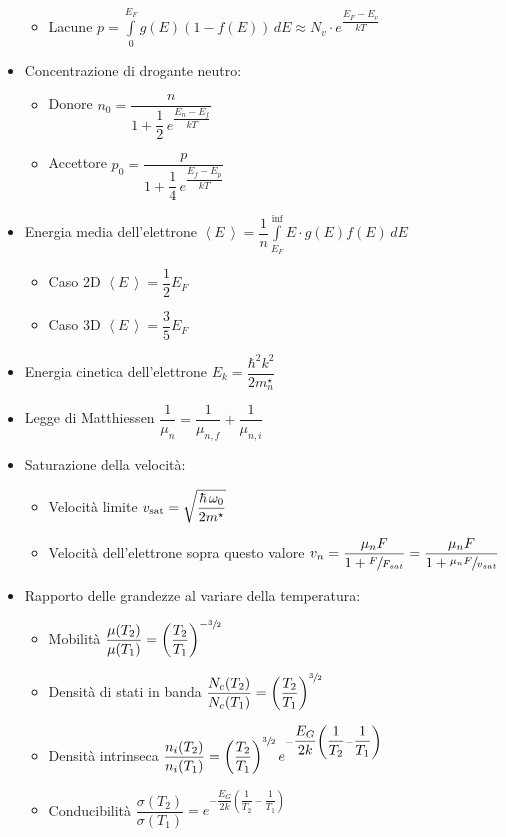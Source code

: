 \documentclass[9pt]{extarticle}
\begin{document}
\begin{itemize}
\begin{itemize}
          \item Lacune \( \displaystyle p = \int\limits_{0}^{E_F} g(E) \left( 1- f(E) \right) \, dE \approx N_v \cdot e ^  {\dfrac{E_F - E_v}{kT}} \)
        \end{itemize}
  \item Concentrazione di drogante neutro:
        \begin{itemize}
          \item Donore \( n_0 = \dfrac{n}{1 + \dfrac{1}{2} \, e^{\dfrac{E_n-E_f}{kT}}} \)
          \item Accettore \( p_0 = \dfrac{p}{1 + \dfrac{1}{4} \, e^{\dfrac{E_f-E_p}{kT}}} \)
        \end{itemize}

  \item Energia media dell'elettrone \( \displaystyle \left<E\,\right> = \dfrac{1}{n} \int\limits_{E_F}^{\inf} E \cdot g(E) f(E) \, dE \)
        \begin{itemize}
          \item Caso 2D \(\left<E\,\right> = \dfrac{1}{2} E_F \)
          \item Caso 3D \(\left<E\,\right> = \dfrac{3}{5} E_F \)
        \end{itemize}
  \item Energia cinetica dell'elettrone \( E_k = \dfrac{\hbar^2 k^2}{2 m_n^\star} \)
  \item Legge di Matthiessen \( \dfrac{1}{\mu_n} = \dfrac{1}{\mu_{n, f}} + \dfrac{1}{\mu_{n, i}} \)

        \newpage

  \item Saturazione della velocità:
        \begin{itemize}
          \item Velocità limite \( v_{\textnormal{sat}} = \sqrt{\dfrac{\hbar \, \omega_{0}}{2m^\star}} \)
          \item Velocità dell'elettrone sopra questo valore \( v_n = \dfrac{\mu_n F}{1 + \sfrac{F}{F_{sat}}} = \dfrac{\mu_n F }{1 + \sfrac{\mu_n F}{v_{sat}}} \)
        \end{itemize}
  \item Rapporto delle grandezze al variare della temperatura:
        \begin{itemize}
          \item Mobilità \( \dfrac{\mu (T_2)}{\mu (T_1)} = \left( \dfrac{T_2}{T_1} \right) ^ {-\sfrac{3}{2}} \)
          \item Densità di stati in banda \( \dfrac{N_c (T_2)}{N_c  (T_1)} = \left( \dfrac{T_2}{T_1} \right) ^ {\sfrac{3}{2}} \)
          \item Densità intrinseca \( \dfrac{n_i (T_2)}{n_i (T_1)} = \left(\dfrac{T_2}{T_1}\right) ^ {\sfrac{3}{2}} e ^ {- \dfrac{E_G}{2 k} \left(\dfrac{1}{T_2} - \dfrac{1}{T_1} \right) } \)
          \item Conducibilità \( \dfrac{\sigma (T_2)}{\sigma (T_1)} = e ^ {- \dfrac{E_G}{2 k} \left(\dfrac{1}{T_2} - \dfrac{1}{T_1} \right) } \)
        \end{itemize}
\end{itemize}
\end{document}
